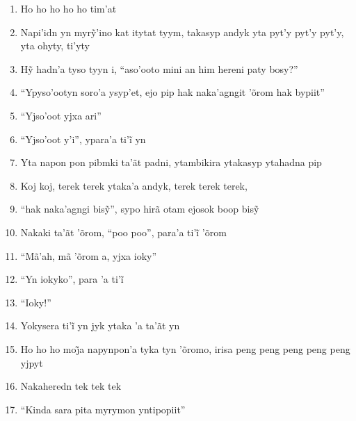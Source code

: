\begin{enumerate}
 \item Ho ho ho ho ho tim'at

 \item Napi’idn yn myrỹ’ino kat itytat tyym, takasyp andyk yta pyt’y pyt’y pyt’y, yta ohyty, ti’yty

 \item Hỹ hadn’a tyso tyyn i, ``aso’ooto mini an him hereni paty bosy?''

 \item ``Ypyso'ootyn soro'a ysyp'et, ejo pip hak naka'agngit 'õrom hak
 bypiit''

 \item ``Yjso'oot yjxa ari''

 \item ``Yjso’oot y’i'', ypara’a ti’ĩ yn

 \item Yta napon pon pibmki ta'ãt padni, ytambikira ytakasyp ytahadna pip

 \begin{center}\end{center}

 \item Koj koj, terek terek ytaka'a andyk, terek terek terek,

 \item ``hak naka’agngi bisỹ'', sypo hirã otam ejosok boop bisỹ

 \item Nakaki ta’ãt ’õrom, ``poo poo'', para’a ti’ĩ ’õrom

 \item ``Mã'ah, mã 'õrom a, yjxa ioky''

 \item ``Yn iokyko'', para ’a ti’ĩ

 \item ``Ioky!''

 \item Yokysera ti’ĩ yn jyk ytaka ’a ta’ãt yn

 \item Ho ho ho moj̃a napynpon’a tyka tyn ’õromo, irisa peng peng peng peng peng yjpyt

 \item Nakaheredn tek tek tek

 \begin{center}\end{center}

 \item ``Kinda sara pita myrymon yntipopiit''


\end{enumerate}
